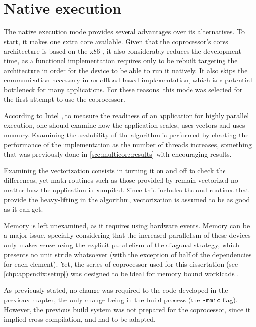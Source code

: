 \documentclass[../thesis]{subfiles}
\begin{document}
	\section{Native execution}
	\label{sec:mic:native}

	The native execution mode provides several advantages over its alternatives. To start, it makes one extra core available. Given that the coprocessor's cores architecture is based on the x86 \isa, it also considerably reduces the development time, as a \cpu functional implementation requires only to be rebuilt targeting the \mic architecture in order for the device to be able to run it natively. It also skips the communication necessary in an offload-based implementation, which is a potential bottleneck for many applications. For these reasons, this mode was selected for the first attempt to use the \intel\xeonphi coprocessor.

	According to Intel \cite{Intel:MIC:Overview}, to measure the readiness of an application for highly parallel execution, one should examine how the application scales, uses vectors and uses memory. Examining the scalability of the algorithm is performed by charting the performance of the implementation as the number of threads increases, something that was previously done in \cref{sec:multicore:results} with encouraging results.

	Examining the vectorization consists in turning it on and off to check the differences, yet math routines such as those provided by \intel\mkl remain vectorized no matter how the application is compiled. Since this includes the \blas and \lapack routines that provide the heavy-lifting in the algorithm, vectorization is assumed to be as good as it can get.

	Memory is left unexamined, as it requires using hardware events. Memory can be a major issue, specially considering that the increased parallelism of these devices only makes sense using the explicit parallelism of the diagonal strategy, which presents no unit stride whatsoever (with the exception of half of the dependencies for each element). Yet, the series of \intel\xeonphi coprocessor used for this dissertation (see \cref{chp:appendix:setup}) was designed to be ideal for memory bound workloads \cite{Intel:MIC:Discovery}.

	As previously stated, no change was required to the code developed in the previous chapter, the only change being in the build process (the \texttt{-mmic} flag). However, the previous build system was not prepared for the \intel\xeonphi coprocessor, since it implied cross-compilation, and had to be adapted.

	
\end{document}
